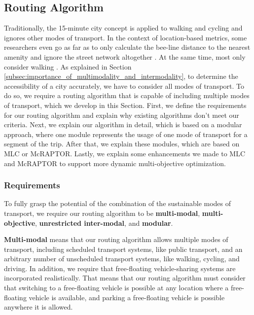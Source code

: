 \subsection{Routing Algorithm}
\label{subs:routing_algorithm}
Traditionally, the 15-minute city concept is applied to walking and cycling and ignores other modes of transport.
In the context of location-based metrics, some researchers even go as far as to only calculate the bee-line distance to the nearest amenity and ignore the street network altogether . At the same time, most only consider walking .
As explained in Section \ref{subsec:importance_of_multimodality_and_intermodality}, to determine the accessibility of a city accurately, we have to consider all modes of transport.
To do so, we require a routing algorithm that is capable of including multiple modes of transport, which we develop in this Section.
First, we define the requirements for our routing algorithm and explain why existing algorithms don't meet our criteria.
Next, we explain our algorithm in detail, which is based on a modular approach, where one module represents the usage of one mode of transport for a segment of the trip.
After that, we explain these modules, which are based on MLC or McRAPTOR.
Lastly, we explain some enhancements we made to MLC and McRAPTOR to support more dynamic multi-objective optimization.

\subsubsection{Requirements}
\label{subsubsec:requirements}

To fully grasp the potential of the combination of the sustainable modes of transport, we require our routing algorithm to be \textbf{multi-modal}, \textbf{multi-objective}, \textbf{unrestricted inter-modal}, and \textbf{modular}.

\textbf{Multi-modal} means that our routing algorithm allows multiple modes of transport, including scheduled transport systems, like public transport, and an arbitrary number of unscheduled transport systems, like walking, cycling, and driving.
In addition, we require that free-floating vehicle-sharing systems are incorporated realistically.
That means that our routing algorithm must consider that switching to a free-floating vehicle is possible at any location where a free-floating vehicle is available, and parking a free-floating vehicle is possible anywhere it is allowed.

